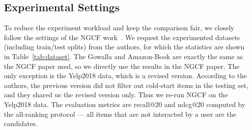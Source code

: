 \subsection{Experimental Settings}\label{ss:setting}
To reduce the experiment workload and keep the comparison fair, we closely follow the settings of the NGCF work~\cite{NGCF}. We request the experimented datasets (including train/test splits) from the authors, for which the statistics are shown in Table~\ref{tab:dataset}. 
The Gowalla and Amazon-Book are exactly the same as the NGCF paper used, so we directly use the results in the NGCF paper. The only exception is the Yelp2018 data, which is a revised version. According to the authors, the previous version did not filter out cold-start items in the testing set, and they shared us the revised version only. Thus we re-run NGCF on the Yelp2018 data.
The evaluation metrics are recall@20 and ndcg@20 computed by the all-ranking protocol --- all items that are not interacted by a user are the candidates. 

